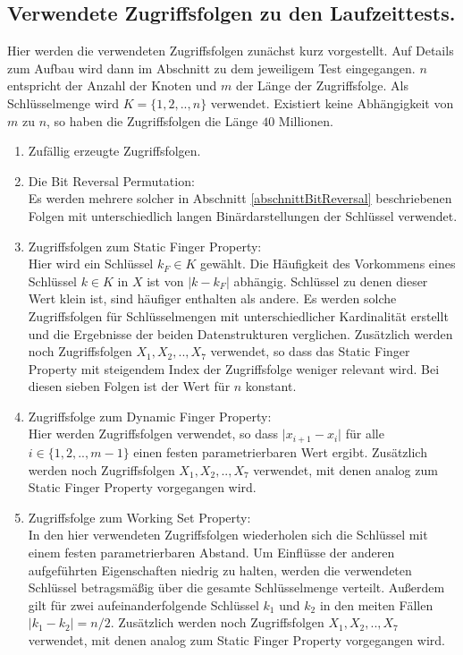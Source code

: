 \documentclass[a4paper,12pt]{article}
\begin{document}
\subsection{Verwendete Zugriffsfolgen zu den Laufzeittests.}
Hier werden die verwendeten Zugriffsfolgen zunächst kurz vorgestellt. Auf Details zum Aufbau wird dann im Abschnitt zu dem  jeweiligem Test eingegangen. $n$ entspricht der Anzahl der Knoten und $m$ der Länge der Zugriffsfolge. Als Schlüsselmenge wird $K = \{1,2,..,n\}$ verwendet. Existiert keine Abhängigkeit von $m$ zu $n$, so haben die Zugriffsfolgen die Länge $40$ Millionen. 

 \begin{enumerate}
 	\item Zufällig erzeugte Zugriffsfolgen.
 	\item Die Bit Reversal Permutation:\\
 	Es werden mehrere solcher in Abschnitt \ref{abschnittBitReversal} beschriebenen Folgen mit unterschiedlich langen Binärdarstellungen der Schlüssel verwendet.
 	\item Zugriffsfolgen zum Static Finger Property: \\
    Hier wird ein Schlüssel $k_F \in K$ gewählt. Die Häufigkeit des Vorkommens eines Schlüssel $k \in K$ in $X$ ist von $\vert k - k_F \vert$ abhängig. Schlüssel zu denen dieser Wert klein ist, sind häufiger enthalten als andere. Es werden solche Zugriffsfolgen für Schlüsselmengen mit unterschiedlicher Kardinalität erstellt und die Ergebnisse der beiden Datenstrukturen verglichen. Zusätzlich werden noch Zugriffsfolgen $X_1, X_2,.., X_7$ verwendet, so dass das Static Finger Property mit steigendem Index der Zugriffsfolge weniger relevant wird. Bei diesen sieben Folgen ist der Wert für $n$ konstant.
 	 \item Zugriffsfolge zum Dynamic Finger Property:\\
 	Hier werden Zugriffsfolgen verwendet, so dass $\vert x_{i+1} - x_{i} \vert$ für alle $i \in \{1, 2,..,m -1\} $ einen festen parametrierbaren Wert ergibt.  Zusätzlich werden noch Zugriffsfolgen $X_1, X_2,.., X_7$ verwendet, mit denen analog zum Static Finger Property vorgegangen wird.
 	\item Zugriffsfolge zum Working Set Property:\\
 	In den hier verwendeten Zugriffsfolgen wiederholen sich die Schlüssel mit einem festen parametrierbaren Abstand. Um Einflüsse der anderen aufgeführten Eigenschaften niedrig zu halten, werden die verwendeten Schlüssel betragsmäßig über die gesamte Schlüsselmenge verteilt. Außerdem gilt für zwei aufeinanderfolgende Schlüssel $k_1$ und $k_2$ in den meiten Fällen $\vert k_1 - k_2 \vert = n /2$. Zusätzlich werden noch Zugriffsfolgen $X_1, X_2,.., X_7$ verwendet, mit denen analog zum Static Finger Property vorgegangen wird.

\end{enumerate}
\end{document}
